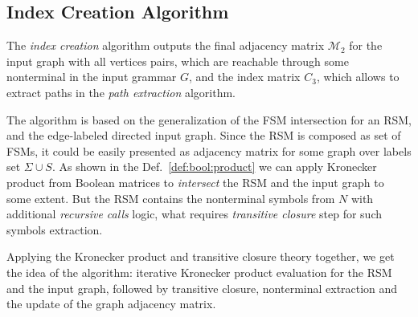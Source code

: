 \subsection{Index Creation Algorithm}

The \textit{index creation} algorithm outputs the final adjacency matrix $\mathcal{M}_2$
for the input graph with all vertices pairs, which are reachable through some nonterminal 
in the input grammar $G$, and the index matrix $C_3$, which allows to extract
paths in the \textit{path extraction} algorithm.

The algorithm is based on the generalization of the FSM intersection for an RSM, 
and the edge-labeled directed input graph. Since the RSM is composed as set of FSMs, 
it could be easily presented as adjacency matrix for some graph over labels set 
$\Sigma \cup S$. As shown in the Def.~\ref{def:bool:product} we can apply 
Kronecker product from Boolean matrices to \textit{intersect} the RSM and the 
input graph to some extent. But the RSM contains the nonterminal symbols from $N$ 
with additional \textit{recursive calls} logic, what requires \textit{transitive closure} 
step for such symbols extraction.

Applying the Kronecker product and transitive closure theory together, we get the idea 
of the algorithm: iterative Kronecker product evaluation for the RSM and the input 
graph, followed by transitive closure, nonterminal extraction and the update 
of the graph adjacency matrix.



